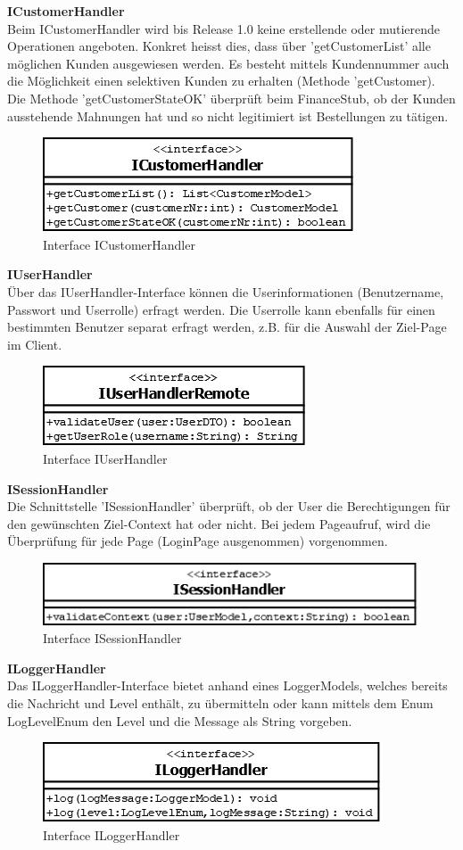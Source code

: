 \textbf{ICustomerHandler}\\
Beim ICustomerHandler wird bis Release 1.0 keine erstellende oder mutierende Operationen angeboten. Konkret heisst dies, dass über 'getCustomerList' alle möglichen Kunden ausgewiesen werden. Es besteht mittels Kundennummer auch die Möglichkeit einen selektiven Kunden zu erhalten (Methode 'getCustomer).\\
Die Methode 'getCustomerStateOK' überprüft beim FinanceStub, ob der Kunden ausstehende Mahnungen hat und so nicht legitimiert ist Bestellungen zu tätigen.
\begin{figure}[H]
	\includegraphics[width=0.4\linewidth]{Images/ICustomerHandler}
	\caption{Interface ICustomerHandler}
	\label{fig:if-ICustomerHandler}
\end{figure}
\textbf{IUserHandler}\\
Über das IUserHandler-Interface können die Userinformationen (Benutzername, Passwort und Userrolle) erfragt werden. Die Userrolle kann ebenfalls für einen bestimmten Benutzer separat erfragt werden, z.B. für die Auswahl der Ziel-Page im Client.
\begin{figure}[H]
	\includegraphics[width=0.4\linewidth]{Images/IUserHandler}
	\caption{Interface IUserHandler}
	\label{fig:if-IUserHandler}
\end{figure}
\clearpage
\textbf{ISessionHandler}\\
Die Schnittstelle 'ISessionHandler' überprüft, ob der User die Berechtigungen für den gewünschten Ziel-Context hat oder nicht. Bei jedem Pageaufruf, wird die Überprüfung für jede Page (LoginPage ausgenommen) vorgenommen.
\begin{figure}[H]
	\includegraphics[width=0.5\linewidth]{Images/ISessionHandler}
	\caption{Interface ISessionHandler}
	\label{fig:if-ISessionHandler}
\end{figure}
\textbf{ILoggerHandler}\\
Das ILoggerHandler-Interface bietet anhand eines LoggerModels, welches bereits die Nachricht und Level enthält, zu übermitteln oder kann mittels dem Enum LogLevelEnum den Level und die Message als String vorgeben.
\begin{figure}[H]
	\includegraphics[width=0.5\linewidth]{Images/ILoggerHandler}
	\caption{Interface ILoggerHandler}
	\label{fig:if-ILoggerHandler}
\end{figure}

